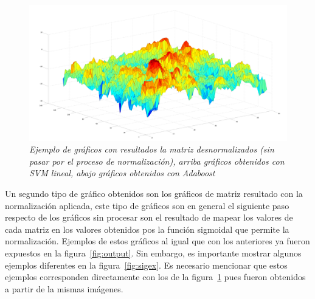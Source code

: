 \begin{figure}[H]
  \includegraphics[scale=.1]{images/raw/4}
  \caption{\em Ejemplo de gráficos con resultados la matriz desnormalizados (sin pasar por el proceso de normalización), arriba gráficos obtenidos con SVM lineal, abajo gráficos obtenidos con Adaboost}  
  \label{fig:rawex}
\end{figure}

Un segundo tipo de gráfico obtenidos son los gráficos de matriz resultado con la normalización aplicada, este tipo de gráficos son en general el siguiente paso respecto de los gráficos sin procesar son el resultado de mapear los valores de cada matriz en los valores obtenidos pos la función sigmoidal que permite la normalización. Ejemplos de estos gráficos al igual que con los anteriores ya fueron expuestos en la figura~\ref{fig:output}. Sin embargo, es importante mostrar algunos ejemplos diferentes en la figura~\ref{fig:sigex}. Es necesario mencionar que estos ejemplos corresponden directamente con los de la figura~\ref{fig:rawex} pues fueron obtenidos a partir de la mismas imágenes.



